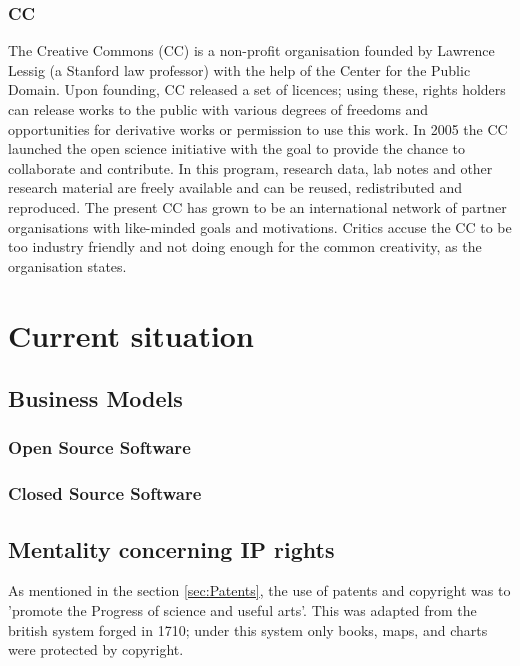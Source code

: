 \documentclass[a4paper]{report}
\begin{document}
\subsection{CC}
\label{sec:CC}
The Creative Commons (CC) is a non-profit organisation founded by Lawrence Lessig (a Stanford law professor) with the help of the Center for the Public Domain. Upon founding, CC released a set of licences; using these, rights holders can release works to the public with various degrees of freedoms and opportunities for derivative works or permission to use this work.
In 2005 the CC launched the open science initiative with the goal to provide the chance to collaborate and contribute. In this program, research data, lab notes and other research material are freely available and can be reused, redistributed and reproduced.
The present CC has grown to be an international network of partner organisations with like-minded goals and motivations. \parencite{Plotkin2002} \parencite{CC2016}
Critics accuse the CC to be too industry friendly and not doing enough for the common creativity, as the organisation states. \parencite{Berry2005}

\chapter{Current situation}
\label{ch:CurrSit}

\section{Business Models}
\label{sec:BusMods}

\subsection{Open Source Software}
\label{ssec:OSS}

\subsection{Closed Source Software}
\label{ssec:CSS}

\section{Mentality concerning IP rights}
\label{sec:IPMent}

As mentioned in the section \ref{sec:Patents}, the use of patents and copyright was to 'promote the Progress of science and useful arts'. This was adapted from the british system forged in 1710; under this system only books, maps, and charts were protected by copyright. \parencite[3]{Cummings2010}
\end{document}
